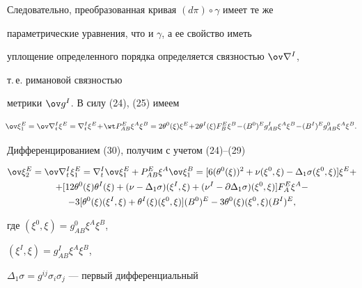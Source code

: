 Следовательно, преобразованная кривая $(d\pi)\circ\gamma$ имеет те же


параметрические уравнения, что и $\gamma$, а ее свойство иметь


уплощение определенного порядка определяется связностью $\ov\nabla^I$,


т.\,е. римановой связностью


метрики $\ov g^I$. В силу (24), (25) имеем


\begin{equation}


\negthickspace \ov\xi^E_1=\ov\nabla^I_t\xi^E=\nabla^I_t\xi^E\!+\!


\wt P^E_{AB}\xi^A\xi^B=


2\theta^0(\xi)\xi^E\!+\!2\theta^I(\xi)F^E_B\xi^B\!-\!


(B^0)^E g^I_{AB}\xi^A\xi^B\!-\!(B^I)^E


g^0_{AB}\xi^A\xi^B.


\end{equation}





Дифференцированием (30), получим с учетом (24)--(29)


\begin{multline}


\ov\xi^E_2=\ov\nabla^I_t\xi^E_1=\nabla^I_t\ov\xi^E_1+


P^E_{AB}\xi^A\ov\xi^B_1=[6(\theta^0(\xi))^2+


\nu(\xi^0,\xi)-\Delta_1\sigma(\xi^0,\xi)]\xi^E+ \\


%


+[12\theta^0(\xi)\theta^I(\xi)+(\nu-\Delta_1\sigma)


(\xi^I,\xi)+(\nu^I-\partial\Delta_1\sigma)


(\xi^0,\xi)]F^E_A\xi^A - \\


%


-3[\theta^0(\xi)(\xi^I,\xi)+\theta^I(\xi)(\xi^0,\xi)]


(B^0)^E-3\theta^0(\xi)(\xi^0,\xi)(B^I)^E,


\end{multline}


где $(\xi^0,\xi)=g^0_{AB}\xi^A\xi^B$,


$(\xi^I,\xi)=g^I_{AB}\xi^A\xi^B$,


$\Delta_1\sigma=g^{ij}\sigma_i\sigma_j$ --- первый дифференциальный


